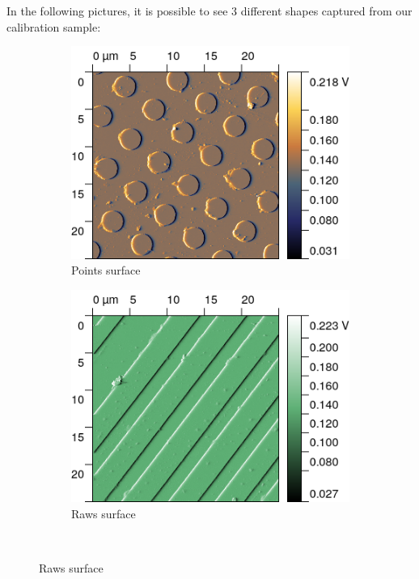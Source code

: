 \documentclass[11pt,a4paper]{article}
\begin{document}
In the following pictures, it is possible to see 3 different shapes captured from our calibration sample:
\begin{figure}[H]
\centering
\begin{subfigure}[b]{0.45\textwidth}
\includegraphics[width=\textwidth]{sm_points}
\caption{Points surface}
\label{fig:sm_points}
\end{subfigure}
\begin{subfigure}[b]{0.45\textwidth}
\includegraphics[width=\textwidth]{sm_raws}
\caption{Raws surface}
\label{fig:sm_raws}
\end{subfigure}\\\vspace{.2cm}

\end{figure}
\end{document}
